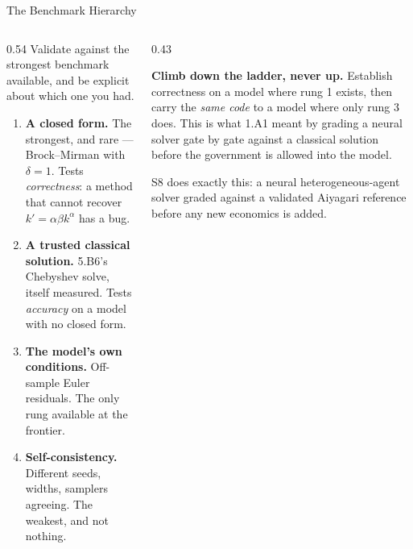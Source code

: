 \begin{frame}{The Benchmark Hierarchy}
\begin{columns}[T]
\begin{column}{0.54\textwidth}
\small
Validate against the strongest benchmark available, and be explicit about which one you had.
\medskip

\begin{enumerate}\small\setlength{\itemsep}{1.2mm}
  \item \textbf{A closed form.} The strongest, and rare --- Brock--Mirman with $\delta=1$. Tests \emph{correctness}: a method that cannot recover $k'=\alpha\beta k^{\alpha}$ has a bug.
  \item \textbf{A trusted classical solution.} 5.B6's Chebyshev solve, itself measured. Tests \emph{accuracy} on a model with no closed form.
  \item \textbf{The model's own conditions.} Off-sample Euler residuals. The only rung available at the frontier.
  \item \textbf{Self-consistency.} Different seeds, widths, samplers agreeing. The weakest, and not nothing.
\end{enumerate}
\end{column}
\begin{column}{0.43\textwidth}
\begin{takeawaybox}[title=\textbf{The discipline}]\small
\textbf{Climb down the ladder, never up.} Establish correctness on a model where rung 1 exists, then carry the \emph{same code} to a model where only rung 3 does.
\medskip
This is what 1.A1 meant by grading a neural solver gate by gate against a classical solution before the government is allowed into the model.
\end{takeawaybox}
\medskip
\begin{examplebox}\footnotesize
S8 does exactly this: a neural heterogeneous-agent solver graded against a validated Aiyagari reference before any new economics is added.
\end{examplebox}
\end{column}
\end{columns}
\vspace{1mm}
\end{frame}

